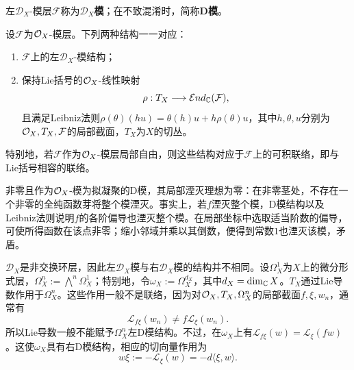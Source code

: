 \begin{definition}\label{L14S1O3}
左$\mathcal D_X$-模层$\mathcal F$称为\textbf{$\mathcal D_X$模}；在不致混淆时，简称\textbf{D模}。
\end{definition}
\begin{lemma}\label{L14S1O4}
设$\mathcal F$为$\mathcal O_X$-模层。下列两种结构一一对应：
\begin{enumerate}[label=(\alph*)]
\item $\mathcal F$上的左$\mathcal D_X$-模结构；
\item 保持Lie括号的$\mathcal O_X$-线性映射
\[\rho:T_X\longrightarrow\mathcal End_{\mathbb{C}}(\mathcal F),\]
且满足Leibniz法则$\rho(\theta)(hu)=\theta(h)u+h\rho(\theta)u$，其中$h,\theta,u$分别为$\mathcal O_X,T_X,\mathcal F$的局部截面，$T_X$为$X$的切丛。
\end{enumerate}
特别地，若$\mathcal F$作为$\mathcal O_X$-模层局部自由，则这些结构对应于$\mathcal F$上的可积联络，即与Lie括号相容的联络。
\end{lemma}
\begin{note}[L14S1O5]
非零且作为$\mathcal O_X$-模为拟凝聚的D模，其局部湮灭理想为零：在非零茎处，不存在一个非零的全纯函数芽将整个模湮灭。事实上，若$f$湮灭整个模，D模结构以及Leibniz法则说明$f$的各阶偏导也湮灭整个模。在局部坐标中选取适当阶数的偏导，可使所得函数在该点非零；缩小邻域并乘以其倒数，便得到常数$1$也湮灭该模，矛盾。
\end{note}
$\mathcal D_X$是非交换环层，因此左$\mathcal D_X$模与右$\mathcal D_X$模的结构并不相同。设$\Omega_X^1$为$X$上的微分形式层，$\Omega_X^n:=\bigwedge^n\Omega_X^1$；特别地，令$\omega_X:=\Omega_X^{d_X}$，其中$d_X=\dim_{\mathbb{C}}X$。$T_X$通过Lie导数作用于$\Omega_X^n$。这些作用一般不是联络，因为对$\mathcal O_X,T_X,\Omega_X^n$的局部截面$f,\xi,w_n$，通常有
\[\mathcal L_{f\xi}(w_n)\ne f\mathcal L_\xi(w_n).\]
所以Lie导数一般不能赋予$\Omega_X^n$左D模结构。不过，在$\omega_X$上有$\mathcal L_{f\xi}(w)=\mathcal L_\xi(fw)$。这使$\omega_X$具有右D模结构，相应的切向量作用为
\[w\xi:=-\mathcal L_\xi(w)=-d\langle\xi,w\rangle.\]

